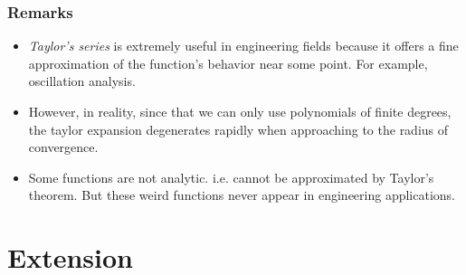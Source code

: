 \documentclass[10pt, t]{beamer}
\renewcommand{\emph}[1]{{\color{themecolor}\textsl{#1}}}
\begin{document}
\begin{frame}
    \frametitle{Remarks}

    \begin{itemize}
        \item \emph{Taylor's series} is extremely useful in engineering fields because it offers a fine approximation of the function's behavior near some point. For example, oscillation analysis.
        \item However, in reality, since that we can only use polynomials of finite degrees, the taylor expansion degenerates rapidly when approaching to the radius of convergence.
        \item Some functions are not analytic. i.e. cannot be approximated by Taylor's theorem. But these weird functions never appear in engineering applications.
    \end{itemize}

\end{frame}

\section{Extension}
\end{document}
